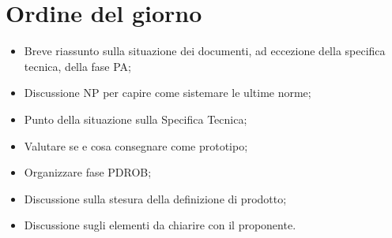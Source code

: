 \documentclass[../RiunioneInterna16-02-19.tex]{subfiles}
\begin{document}
\section{Ordine del giorno}
\begin{itemize}
	\item Breve riassunto sulla situazione dei documenti, ad eccezione della specifica tecnica, della fase PA;
	\item Discussione NP per capire come sistemare le ultime norme;
	\item Punto della situazione sulla Specifica Tecnica;
	\item Valutare se e cosa consegnare come prototipo;
	\item Organizzare fase PDROB;
	\item Discussione sulla stesura della definizione di prodotto;
	\item Discussione sugli elementi da chiarire con il proponente.
\end{itemize}
\end{document}
